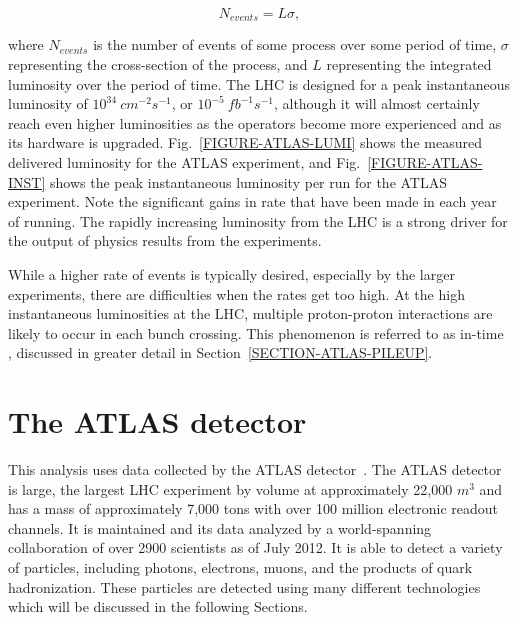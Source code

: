 \begin{equation}
N_{events}=L\sigma,
\end{equation}

\noindent
where $N_{events}$ is the number of events of some process over some period of time, $\sigma$ representing the cross-section of the process, and $L$ representing the integrated luminosity over the period of time. The LHC is designed for a peak instantaneous luminosity of $10^{34}\ cm^{-2}s^{-1}$, or $10^{-5}\ fb^{-1}s^{-1}$, although it will almost certainly reach even higher luminosities as the operators become more experienced and as its hardware is upgraded. Fig.~\ref{FIGURE-ATLAS-LUMI} shows the measured delivered luminosity for the ATLAS experiment, and Fig.~\ref{FIGURE-ATLAS-INST} shows the peak instantaneous luminosity per run for the ATLAS experiment. Note the significant gains in rate that have been made in each year of running. The rapidly increasing luminosity from the LHC is a strong driver for the output of physics results from the experiments.


While a higher rate of events is typically desired, especially by the larger experiments, there are difficulties when the rates get too high. At the high instantaneous luminosities at the LHC, multiple proton-proton interactions are likely to occur in each bunch crossing. This phenomenon is referred to as in-time \pileup, discussed in greater detail in Section~\ref{SECTION-ATLAS-PILEUP}.


\section{The ATLAS detector}
\label{SECTION-ATLAS-DET}
This analysis uses data collected by the ATLAS detector~\cite{ATLAS-TDR}. The ATLAS detector is large, the largest LHC experiment by volume at approximately 22,000 $m^3$ and has a mass of approximately 7,000 tons with over 100 million electronic readout channels. It is maintained and its data analyzed by a world-spanning collaboration of over 2900 scientists as of July 2012. It is able to detect a variety of particles, including photons, electrons, muons, and the products of quark hadronization. These particles are detected using many different technologies which will be discussed in the following Sections.

